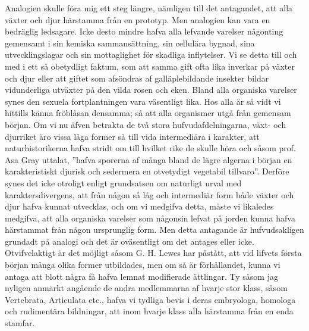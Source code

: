 Analogien skulle föra mig ett steg längre, nämligen till det antagandet, att alla växter och djur härstamma från en prototyp. Men analogien kan vara en bedräglig ledsagare. Icke desto mindre hafva alla lefvande varelser någonting gemensamt i sin kemiska sammansättning, sin cellulära bygnad, sina utvecklingslagar och sin mottaglighet för skadliga inflytelser. Vi se detta till och med i ett så obetydligt faktum, som att samma gift ofta lika inverkar på växter och djur eller att giftet som afsöndras af galläplebildande insekter bildar vidunderliga utväxter på den vilda rosen och eken. Bland alla organiska varelser synes den sexuela fortplantningen vara väsentligt lika. Hos alla är så vidt vi hittills känna fröblåsan densamma; så att alla organismer utgå från gemensam början. Om vi nu äfven betrakta de två stora hufvudafdelningarna, växt- och djurriket äro vissa låga former så till vida intermediära i karakter, att naturhistorikerna hafva stridt om till hvilket rike de skulle höra och såsom prof. Asa Gray uttalat, ”hafva sporerna af många bland de lägre algerna i början en karakteristiskt djurisk och sedermera en otvetydigt vegetabil tillvaro”. Derföre synes det icke otroligt enligt grundsatsen om naturligt urval med karaktersdivergens, att från någon så låg och intermediär form både växter och djur hafva kunnat utvecklas, och om vi medgifva detta, måste vi likaledes medgifva, att alla organiska varelser som någonsin lefvat på jorden kunna hafva härstammat från någon ursprunglig form. Men detta antagande är hufvudsakligen grundadt på analogi och det är oväsentligt om det antages eller icke. Otvifvelaktigt är det möjligt såsom G. H. Lewes har påstått, att vid lifvets första början många olika former utbildades, men om så är förhållandet, kunna vi antaga att blott några få hafva lemnat modifierade ättlingar. Ty såsom jag nyligen anmärkt angående de andra medlemmarna af hvarje stor klass, såsom Vertebrata, Articulata etc., hafva vi tydliga bevis i deras embryologa, homologa och rudimentära bildningar, att inom hvarje klass alla härstamma från en enda stamfar.

